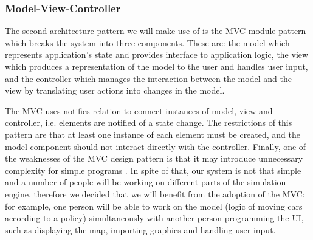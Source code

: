 \documentclass{article}
\begin{document}
\subsubsection{Model-View-Controller}
The second architecture pattern we will make use of is the MVC module pattern which breaks the system into three components. 
These are: the model which represents application's state and provides interface to application logic, the view which produces a representation of the model to the user and handles user input, and the controller which manages the interaction between the model and the view by translating user actions into changes in the model. 

The MVC uses notifies relation to connect instances of model, view and controller, i.e. elements are notified of a state change. 
The restrictions of this pattern are that at least one instance of each element must be created, and the model component should not interact directly with the controller. 
Finally, one of the weaknesses of the MVC design pattern is that it may introduce unnecessary complexity for simple programs \cite{bass2007software}. 
In spite of that, our system is not that simple and a number of people will be working on different parts of the simulation engine, therefore we decided that we will benefit from the adoption of the MVC: for example, one person will be able to work on the model (logic of moving cars according to a policy) simultaneously with another person programming the UI, such as displaying the map, importing graphics and handling user input. 
\end{document}
